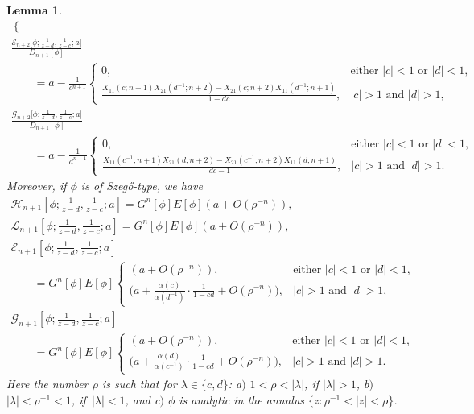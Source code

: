 \documentclass[10pt,a4paper]{amsart}
\numberwithin{equation}{section}
\newtheorem{Lemma}[Theorem]{Lemma}
 { \theoremstyle{definition}
\newtheorem{Definition}[Theorem]{Definition}
\newtheorem{Example}[Theorem]{Example}
\newtheorem{Remark}[Theorem]{Remark}
\newtheorem{Question}[Theorem]{Question}
}
\newcommand{\al}{\alpha}
\newcommand{\la}{\lambda}
\begin{document}
\begin{Lemma}
\begin{gather}
\begin{cases}
					\end{cases}
\\
					\frac{\mathscr{E}_{n+2}\big[\phi; \tfrac{1}{z-d},\tfrac{1}{z-c};a\big]}{D_{n+1}[\phi]}\nonumber\\
 \qquad= a - \frac{1}{c^{n+1}} \begin{cases}
						0, & \text{either $|c|<1$ or $|d|<1$,} \\
						 \tfrac{ X_{11}(c;n+1)X_{21}(d^{-1};n+2) - X_{21}(c;n+2)X_{11}(d^{-1};n+1) }{1-dc}, & \text{$|c|>1$ and $|d|>1$,}
					\end{cases}\nonumber
\\
					 	\frac{\mathscr{G}_{n+2}\big[\phi; \tfrac{1}{z-d},\tfrac{1}{z-c};a\big]}{D_{n+1}[\phi]}\nonumber \\
\qquad= a - \frac{1}{d^{n+1}} \begin{cases}
						0, & \text{either $|c|<1$ or $|d|<1$}, \\
						 \tfrac{ X_{11}(c^{-1};n+1)X_{21}(d;n+2) - X_{21}(c^{-1};n+2)X_{11}(d;n+1) }{dc-1}, & \text{$|c|>1$ and $|d|>1$}.
					\end{cases}\nonumber
			\end{gather}
	Moreover, if $\phi$ is of Szeg\H{o}-type, we have
			\begin{gather}
				\mathscr{H}_{n+1}\left[\phi; \frac{1}{z-d},\frac{1}{z-c};a\right] = G^n[\phi] E[\phi] (a + O(\rho^{-n})),\label{asymp H rationals}\\
				\mathscr{L}_{n+1}\left[\phi; \frac{1}{z-d},\frac{1}{z-c};a\right] = G^n[\phi] E[\phi] (a + O(\rho^{-n})),\nonumber\\
				\mathscr{E}_{n+1}\left[\phi; \frac{1}{z-d},\frac{1}{z-c};a\right]\nonumber\\
\qquad = G^n[\phi] E[\phi] \begin{cases}
					(a + O(\rho^{-n})), & \text{either $|c|<1$ or $|d|<1$}, \\
				 	\big( a + \tfrac{\al(c)}{\al(d^{-1})}\cdot \tfrac{1}{1-cd} + O(\rho^{-n}) \big), & \text{$|c|>1$ and $|d|>1$},
				\end{cases}	\nonumber
\\
				\mathscr{G}_{n+1}\left[\phi; \frac{1}{z-d},\frac{1}{z-c};a\right]\nonumber\\
\qquad = G^n[\phi] E[\phi] \begin{cases}
					(a + O(\rho^{-n})), & \text{either $|c|<1$ or $|d|<1$}, \\
					\big( a + \tfrac{\al(d)}{\al(c^{-1})}\cdot \tfrac{1}{1-cd} + O(\rho^{-n}) \big), & \text{$|c|>1$ and $|d|>1$}.
				\end{cases} 		\nonumber			
			\end{gather}
			Here the number $\rho$ is such that for $\la \in \{c,d\}$: a$)$ $1<\rho < |\la|$, if $|\la|>1$, b$)$ $|\la|<\rho^{-1}<1$, if~${|\la|<1}$, and c$)$ $\phi$ is analytic in the annulus $\big\{z\colon \rho^{-1}<|z|<\rho\big\}$.
		\end{Lemma}
\end{document}
